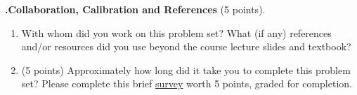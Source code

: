 \documentclass[12pt]{amsart}
\newenvironment{statement}[1]{\smallskip\noindent\color[rgb]{0.0,0.0,0.0} {\bf #1.}}{}
\newcommand{\1}{\mathds{1}}
\begin{document}
\newpage
\begin{statement}{6}
\noindent \textbf{Collaboration, Calibration and References} (5 points).
\begin{enumerate}
    \item With whom did you work on this problem set? What (if any) references and/or resources did you use beyond the course lecture slides and textbook? 
    \item (5 points) Approximately how long did it take you to complete this problem set? Please complete this brief \href{https://forms.gle/ZNZXCydWp4Py9Qen6}{survey} worth 5 points, graded for completion.
\end{enumerate}
\end{statement}
\end{document}
